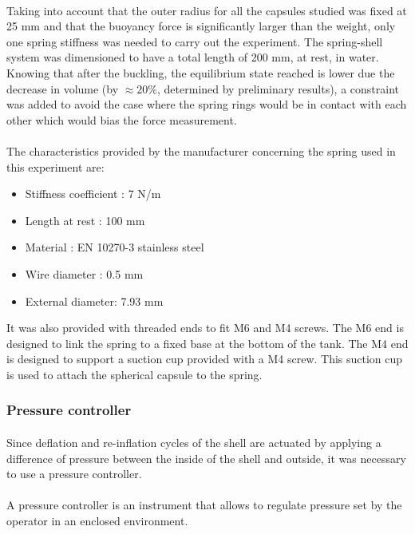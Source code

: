 \paragraph{}
Taking into account that the outer radius for all the capsules studied was fixed at 25 mm and that the buoyancy force is significantly larger than the weight, only one spring stiffness was needed to carry out the experiment.
The spring-shell system was dimensioned to have a total length of 200 mm, at rest, in water. Knowing that after the buckling, the equilibrium state reached is lower due the decrease in volume (by $\approx 20\%$, determined by preliminary results), a constraint was added to avoid the case where the spring rings would be in contact with each other which would bias the force measurement.
\paragraph{}
The characteristics provided by the manufacturer concerning the spring used in this experiment are:
\
\begin{itemize}
	\item Stiffness coefficient : 7 N/m
	\item Length at rest : 100 mm 
	\item Material : EN 10270-3 stainless steel
	\item Wire diameter : 0.5 mm
	\item External diameter: 7.93 mm
\end{itemize}

It was also provided with threaded ends to fit M6 and M4 screws. The M6 end is designed to link the spring to a fixed base at the bottom of the tank. The M4 end is designed to support a suction cup provided with a M4 screw. This suction cup is used to attach the spherical capsule to the spring.




\subsubsection{Pressure controller}
\label{sssection:pressure_controller}
\paragraph{}
Since deflation and re-inflation cycles of the shell are actuated by applying a difference of pressure between the inside of the shell and outside, it was necessary to use a pressure controller.
\paragraph{}
A pressure controller is an instrument that allows to regulate pressure set by the operator in an enclosed environment.
